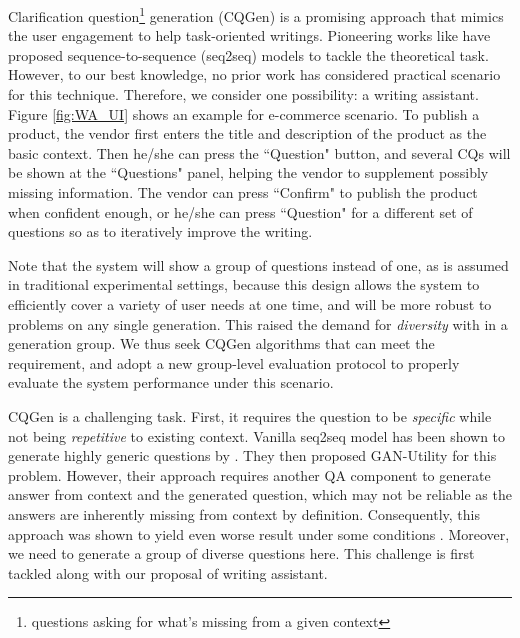 Clarification question\footnote{questions asking for what's missing from a given context} generation (CQGen) is a promising approach that mimics the user engagement to help task-oriented writings. Pioneering works like \citet{rao2019answer} have proposed sequence-to-sequence (seq2seq) models to tackle the theoretical task. However, to our best knowledge, no prior work has considered practical scenario for this technique. 
Therefore, we consider one possibility: a writing assistant. Figure \ref{fig:WA_UI} shows an example for e-commerce scenario. To publish a product, the vendor first enters the title and description of the product as the basic context. Then he/she can press the ``Question" button, and several CQs will be shown at the ``Questions" panel, helping the vendor to supplement possibly missing information. The vendor can press ``Confirm" to publish the product when confident enough, or he/she can press ``Question" for a different set of questions so as to iteratively improve the writing. 

Note that the system will show a group of questions instead of one, as is assumed in traditional experimental settings, because this design allows the system to efficiently cover a variety of user needs at one time, and will be more robust to problems on any single generation. This raised the demand for \textit{diversity} with in a generation group. We thus seek CQGen algorithms that can meet the requirement, and adopt a new group-level evaluation protocol to properly evaluate the system performance under this scenario.

CQGen is a challenging task. First, it requires the question to be \textit{specific} while not being \textit{repetitive} to existing context. Vanilla seq2seq model has been shown to generate highly generic questions by \citet{rao2019answer}. They then proposed GAN-Utility for this problem. However, their approach requires another QA component to generate answer from context and the generated question, which may not be reliable as the answers are inherently missing from context by definition. Consequently, this approach was shown to yield even worse result under some conditions \citep{cao2019controlling}. Moreover, we need to generate a group of diverse questions here. This challenge is first tackled along with our proposal of writing assistant. 

